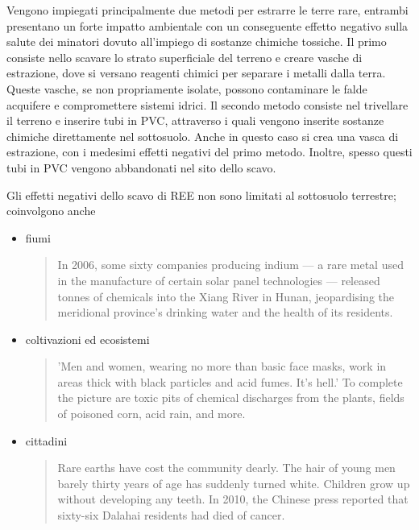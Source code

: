 \documentclass[12pt,a4paper,oneside]{book}
\begin{document}
Vengono impiegati principalmente due metodi per estrarre le terre rare, entrambi presentano un forte impatto ambientale con un conseguente effetto negativo sulla salute dei minatori dovuto all'impiego di sostanze chimiche tossiche. Il primo consiste nello scavare lo strato superficiale del terreno e creare vasche di estrazione, dove si versano reagenti chimici per separare i metalli dalla terra. Queste vasche, se non propriamente isolate, possono contaminare le falde acquifere e compromettere sistemi idrici.
Il secondo metodo consiste nel trivellare il terreno e inserire tubi in PVC, attraverso i quali vengono inserite sostanze chimiche direttamente nel sottosuolo. Anche in questo caso si crea una vasca di estrazione, con i medesimi effetti negativi del primo metodo. Inoltre, spesso questi tubi in PVC vengono abbandonati nel sito dello scavo.

Gli effetti negativi dello scavo di REE non sono limitati al sottosuolo terrestre; coinvolgono anche

\begin{itemize}
\item fiumi
\begin{quote}
\small
In 2006, some sixty companies producing indium — a rare metal used in the manufacture of certain solar panel technologies — released tonnes of chemicals into the Xiang River in Hunan, jeopardising the meridional province’s drinking water and the health of its residents. \citep[p. 25]{pitron2020rare}
\end{quote}

\item coltivazioni ed ecosistemi
\begin{quote}
\small
'Men and women, wearing no more than basic face masks, work in areas thick with black particles and acid fumes. It’s hell.' To complete the picture are toxic pits of chemical discharges from the plants, fields of poisoned corn, acid rain, and more. \citep[p. 26]{pitron2020rare}
\end{quote}

\item cittadini
\begin{quote}
\small
Rare earths have cost the community dearly. The hair of young men barely thirty years of age has suddenly turned white. Children grow up without developing any teeth. In 2010, the Chinese press reported that sixty-six Dalahai residents had died of cancer. \citep[p. 29]{pitron2020rare}
\end{quote}
    
\end{itemize}
\end{document}
